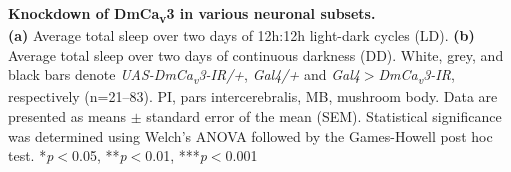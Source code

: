 \label{fig:S5}
\textbf{Knockdown of DmCa\textsubscript{v}3 in various neuronal subsets.}
\\
\textbf {(a)} Average total sleep over two days of 12h:12h light-dark cycles (LD).
\textbf {(b)} Average total sleep over two days of continuous darkness (DD).
White, grey, and black bars denote \emph{UAS-DmCa\textsubscript{v}3-IR/+}, \emph{Gal4/+} and \emph{Gal4$>$DmCa\textsubscript{v}3-IR}, respectively (n=21--83).
PI, pars intercerebralis, MB, mushroom body. 
Data are presented as means $\pm$ standard error of the mean (SEM).
Statistical significance was determined using Welch's ANOVA followed by the Games-Howell post hoc test.
*\emph{p}$<$0.05, **\emph{p}$<$0.01, ***\emph{p}$<$0.001
